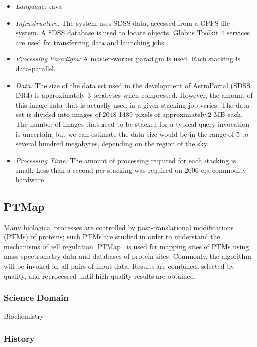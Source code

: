 \documentclass[10pt,letterpaper]{article}
\begin{document}
\begin {itemize}
\item {\em Language:} Java
\item {\em Infrastructure:} The system uses SDSS data, accessed from a GPFS file system.
A SDSS database is used to locate objects.  Globus Toolkit 4 services are used for
transferring data and launching jobs.
\item {\em Processing Paradigm:} A master-worker paradigm is used.  Each stacking is data-parallel.
\item {\em Data:} The size of the data set used in the development of AstroPortal (SDSS DR4)
is approximately 3 terabytes when compressed.  However, the amount of this image
data that is actually used in a given stacking job varies.  The data set
is divided into images of 2048  1489 pixels of approximately 2 MB
each.  The number of images that need to be stacked for a typical query invocation
is uncertain, but we can estimate the data size would be in the range of 5 to several
hundred megabytes, depending on the region of the sky.

\item {\em Processing Time:} The amount of processing required for each stacking is small.
Less than a second per stacking was required on 2006-era commodity hardware .



\end{itemize}

\subsection{PTMap}

Many biological processes are controlled by post-translational
modifications (PTMs) of proteins; such
PTMs are studied in order to understand the mechanisms of cell regulation.
PTMap~\cite{ptmap09} is used for mapping sites of PTMs
using mass spectrometry data and databases of protein sites.
Commonly, the algorithm will be invoked on all pairs
of input data.  Results are combined, selected by quality, and
reprocessed until high-quality results are obtained.

\subsubsection{Science Domain} Biochemistry

\subsubsection{History}
\end{document}
